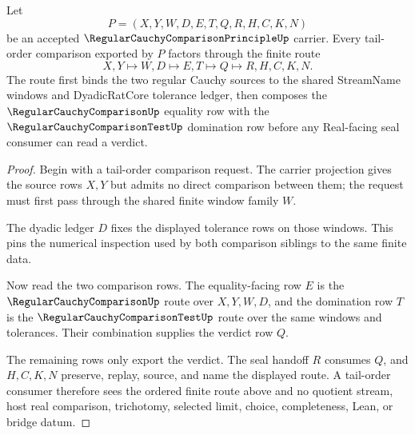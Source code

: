 \begin{theorem}
\label{thm:regular-cauchy-comparison-principle-tail-order-route}
Let
$$
P=(X,Y,W,D,E,T,Q,R,H,C,K,N)
$$
be an accepted $\RegularCauchyComparisonPrincipleUp$ carrier. Every tail-order comparison exported by $P$ factors through the finite route
$$
X,Y\longmapsto W,D\longmapsto E,T\longmapsto Q\longmapsto R,H,C,K,N .
$$
The route first binds the two regular Cauchy sources to the shared StreamName windows and DyadicRatCore tolerance ledger, then composes the $\RegularCauchyComparisonUp$ equality row with the $\RegularCauchyComparisonTestUp$ domination row before any Real-facing seal consumer can read a verdict.
\end{theorem}
\begin{proof}
Begin with a tail-order comparison request. The carrier projection gives the source rows $X,Y$ but admits no direct comparison between them; the request must first pass through the shared finite window family $W$.

The dyadic ledger $D$ fixes the displayed tolerance rows on those windows. This pins the numerical inspection used by both comparison siblings to the same finite data.

Now read the two comparison rows. The equality-facing row $E$ is the $\RegularCauchyComparisonUp$ route over $X,Y,W,D$, and the domination row $T$ is the $\RegularCauchyComparisonTestUp$ route over the same windows and tolerances. Their combination supplies the verdict row $Q$.

The remaining rows only export the verdict. The seal handoff $R$ consumes $Q$, and $H,C,K,N$ preserve, replay, source, and name the displayed route. A tail-order consumer therefore sees the ordered finite route above and no quotient stream, host real comparison, trichotomy, selected limit, choice, completeness, Lean, or bridge datum.
\end{proof}


